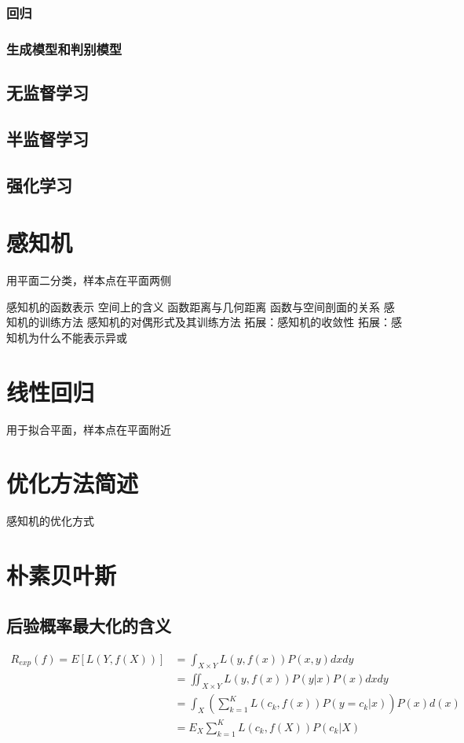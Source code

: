     \subsubsection{回归}
    \subsubsection{生成模型和判别模型}
    \subsection{无监督学习}
    \subsection{半监督学习}
    \subsection{强化学习}
    \section{感知机}
    用平面二分类，样本点在平面两侧

    感知机的函数表示
    空间上的含义
    函数距离与几何距离
    函数与空间剖面的关系
    感知机的训练方法
    感知机的对偶形式及其训练方法
    拓展：感知机的收敛性
    拓展：感知机为什么不能表示异或
    \section{线性回归}
    用于拟合平面，样本点在平面附近
    \section{优化方法简述}
    感知机的优化方式
    \section{朴素贝叶斯}

    \subsection{后验概率最大化的含义}
    \begin{equation}
        \begin{aligned} 
            R_{e x p}(f)=E[L(Y, f(X))] &=\int_{X \times Y} L(y, f(x)) P(x, y) d x d y \\ &=\iint_{X \times Y} L(y, f(x)) P(y | x) P(x) d x d y \\ &=\int_{X}\left(\sum_{k=1}^{K} L\left(c_{k}, f(x)\right) P\left(y=c_{k} | x\right)\right) P(x) d(x) \\ &=E_{X} \sum_{k=1}^{K} L\left(c_{k}, f(X)\right) P\left(c_{k} | X\right) 
        \end{aligned}
    \end{equation}


